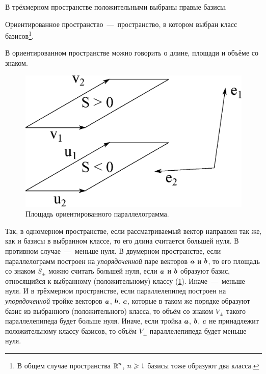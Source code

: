 \documentclass[a4paper,12pt]{article}
\begin{document}
  В трёхмерном пространстве положительными выбраны правые базисы.
  
  \begin{definition}
    Ориентированное пространство~---~пространство, в котором выбран класс базисов\footnote{В общем случае пространства $\operatorname{\mathbb R}^n$, $n \hm\geq 1$ базисы тоже образуют два класса.}.
  \end{definition}
  
  В ориентированном пространстве можно говорить о длине, площади и объёме со знаком.
  
  \begin{figure}[h]
    \centering
    
    \includegraphics[width=0.5\columnwidth]{two-parallelograms}
    
    \caption{Площадь ориентированного параллелограмма.}
    \label{fig:two-parallelograms}
  \end{figure}
  
  Так, в одномерном пространстве, если рассматриваемый вектор направлен так же, как и базисы в выбранном классе, то его длина считается большей нуля.
  В противном случае~---~меньше нуля.
  В двумерном пространстве, если параллелограмм построен на \emph{упорядоченной} паре векторов $\boldsymbol a$ и $\boldsymbol b$, то его площадь со знаком $S_{\pm}$ можно считать большей нуля, если $\boldsymbol a$ и $\boldsymbol b$ образуют базис, относящийся к выбранному (положительному) классу (\ref{fig:two-parallelograms}).
  Иначе~---~меньше нуля.
  И в трёхмерном пространстве, если параллелепипед построен на \emph{упорядоченной} тройке векторов $\boldsymbol a$, $\boldsymbol b$, $\boldsymbol c$, которые в таком же порядке образуют базис из выбранного (положительного) класса, то объём со знаком $V_{\pm}$ такого параллелепипеда будет больше нуля.
  Иначе, если тройка $\boldsymbol a$, $\boldsymbol b$, $\boldsymbol c$ не принадлежит положительному классу базисов, то объём $V_{\pm}$ параллелепипеда будет меньше нуля.
  
\end{document}
